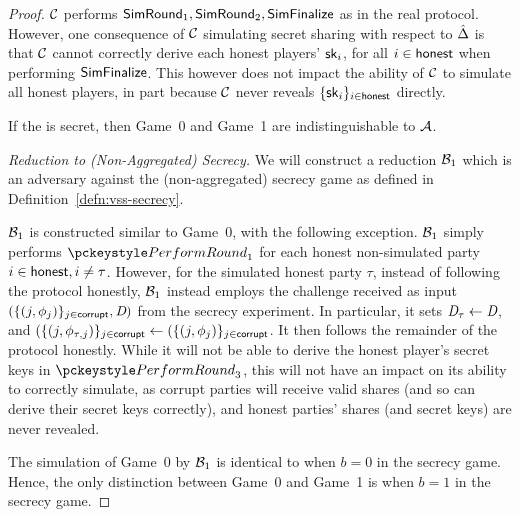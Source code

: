 \begin{proof}
$\mathcal{C}$ performs $\mathsf{SimRound}_1, \mathsf{SimRound}_2,\mathsf{SimFinalize}$ as in the real protocol.
However, one consequence of $\mathcal{C}$ simulating secret sharing with respect to $\hat{\Delta}$ is that
$\mathcal{C}$ cannot correctly derive each honest players' $\mathsf{sk}_i$, for all $i \in
\mathsf{honest}$ when performing $\mathsf{SimFinalize}$.
This however does not impact the ability of $\mathcal{C}$ to simulate all honest players,
in part because $\mathcal{C}$ never reveals $\{ \mathsf{sk}_i \}_{i \in \mathsf{honest}}$  directly.

If the \AVSS is secret,
then Game~0 and Game~1 are indistinguishable to $\mathcal{A}$.

\medskip

\noindent \textit{Reduction to \AVSS (Non-Aggregated) Secrecy.}
We will construct a reduction $\mathcal{B}_1$ which is an adversary against the \AVSS (non-aggregated) secrecy game as defined in Definition~\ref{defn:vss-secrecy}.

$\mathcal{B}_1$ is constructed similar to Game~0,
with the following exception.
$\mathcal{B}_1$ simply performs $\dkgkeygen_1$ for each honest non-simulated party $i \in \mathsf{honest}, i \neq \tau$.
However, for the simulated honest party $\tau$,
instead of following the protocol honestly,
$\mathcal{B}_1$ instead employs the challenge received as input $(\{(j, \phi_j)\}_{j \in \mathsf{corrupt}}, \textit{D}) $
from the \AVSS secrecy experiment.
In particular, it sets $\textit{D}_\tau \gets \textit{D}$,
and $(\{(j, \phi_{\tau,j} )\}_{j \in \mathsf{corrupt}}\allowbreak\gets (\{(j, \phi_j)\}_{j \in \mathsf{corrupt}}$.
It then follows the remainder of the protocol honestly.
While it will not be able to derive the honest player's secret keys in $\dkgkeygen_3$,
this will not have an impact on its ability to correctly simulate,
as corrupt parties will receive valid shares (and so can derive their secret keys correctly),
and honest parties' shares (and secret keys) are never revealed.


The simulation of Game~0 by $\mathcal{B}_1$ is identical to when $b=0$ in the \AVSS secrecy game.
Hence, the only distinction between Game~0 and Game~1 is when $b=1$ in the \AVSS secrecy game.


\end{proof}
